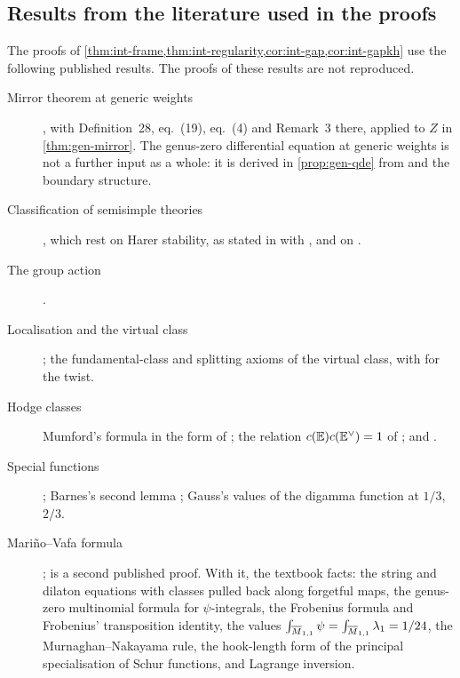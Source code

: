 \subsection{Results from the literature used in the proofs}
\label{sec:int-inputs}

The proofs of \cref{thm:int-frame,thm:int-regularity,cor:int-gap,cor:int-gapkh} use the following published results. The proofs of these results are not reproduced.
\begin{description}
\item[Mirror theorem at generic weights] \cite[Theorem~31]{CCIT15}, with Definition~28, eq.~(19), eq.~(4) and Remark~3 there, applied to $Z$ in \cref{thm:gen-mirror}.  The genus-zero differential equation at generic weights is not a further input as a whole: it is derived in \cref{prop:gen-qde} from \cite[Lemma~1]{Pan98} and the boundary structure.
\item[Classification of semisimple theories] \cite[Theorem~(2), Proposition~8.7(ii), 2.17--2.19, (2.15)]{Tel12}, which rest on Harer stability, as stated in \cite[Propositions~(2.1), (2.2)]{Loo96} with \cite{Har85,Iva90}, and on \cite[Theorem~1.1.1]{MW07}. 
\item[The group action] \cite[Definitions~2.2, 2.5, 2.13, Proposition~2.14, Section~3.2 and (5)]{PPZ15}.
\item[Localisation and the virtual class] \cite[formula~(1), Appendices~A, C]{GP99}; the fundamental-class and splitting axioms of the virtual class, with \cite[Appendix~1 (iv)--(vi)]{CG07} for the twist.
\item[Hodge classes] Mumford's formula in the form of \cite[Theorem (Mumford), Section~1.1]{FP00}; the relation $c(\mathbb{E})c(\mathbb{E}^\vee)=1$ of \cite[(5.4), (5.5)]{Mum83}; and \cite[Theorem~4]{FP00}.
\item[Special functions] \cite[Eq.~15.6.7]{DLMF}; Barnes's second lemma \cite{Bar10}; Gauss's values of the digamma function at $1/3$, $2/3$. 
\item[Mari\~no--Vafa formula] \cite[eq.~(1)--(3)]{LLZ03}; \cite[Theorem~1]{OP04} is a second published proof. With it, the textbook facts: the string and dilaton equations with classes pulled back along forgetful maps, the genus-zero multinomial formula for $\psi$-integrals, the Frobenius formula and Frobenius' transposition identity, the values $\int_{\overline{M}_{1,1}}\psi=\int_{\overline{M}_{1,1}}\lambda_1=1/24$, the Murnaghan--Nakayama rule, the hook-length form of the principal specialisation of Schur functions, and Lagrange inversion.
\end{description}

